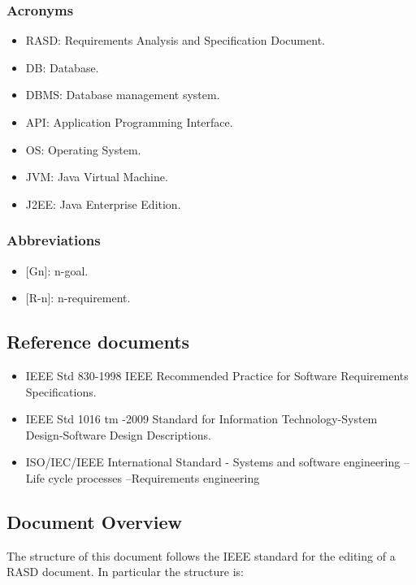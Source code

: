 \subsubsection{Acronyms}
\begin{itemize} 
	\item RASD: Requirements Analysis and Specification Document.
	\item DB: Database.
	\item DBMS: Database management system.
	\item API: Application Programming Interface.
	\item OS: Operating System.
	\item JVM: Java Virtual Machine.
	\item J2EE: Java Enterprise Edition.
\end{itemize}

\subsubsection{Abbreviations}
\begin{itemize}
	\item {[}Gn{]}: n-goal.
	\item {[}R-n{]}: n-requirement.
\end{itemize}


\subsection{Reference documents}
\begin{itemize}
	\item IEEE Std 830-1998 IEEE Recommended Practice for Software Requirements Specifications.
	\item IEEE Std 1016 tm -2009 Standard for Information Technology-System Design-Software Design Descriptions.
	\item ISO/IEC/IEEE International Standard - Systems and software engineering -- Life cycle processes --Requirements engineering
\end{itemize}

\subsection{Document Overview}
The structure of this document follows the IEEE standard for the editing of a RASD document. In particular the structure is:

